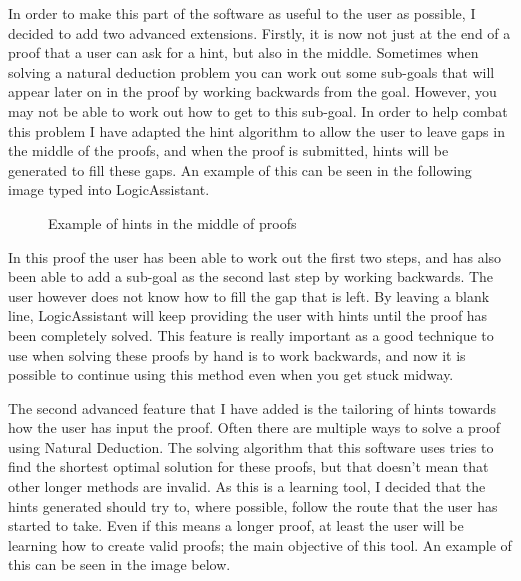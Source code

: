 In order to make this part of the software as useful to the user as possible, I decided to add two advanced extensions. Firstly, it is now not just at the end of a proof that a user can ask for a hint, but also in the middle. Sometimes when solving a natural deduction problem you can work out some sub-goals that will appear later on in the proof by working backwards from the goal. However, you may not be able to work out how to get to this sub-goal. In order to help combat this problem I have adapted the hint algorithm to allow the user to leave gaps in the middle of the proofs, and when the proof is submitted, hints will be generated to fill these gaps. An example of this can be seen in the following image typed into LogicAssistant.

\begin{figure}[!ht]
	\centering
	\caption{Example of hints in the middle of proofs}
\end{figure}

In this proof the user has been able to work out the first two steps, and has also been able to add a sub-goal as the second last step by working backwards. The user however does not know how to fill the gap that is left. By leaving a blank line, LogicAssistant will keep providing the user with hints until the proof has been completely solved. This feature is really important as a good technique to use when solving these proofs by hand is to work backwards, and now it is possible to continue using this method even when you get stuck midway. 

The second advanced feature that I have added is the tailoring of hints towards how the user has input the proof. Often there are multiple ways to solve a proof using Natural Deduction. The solving algorithm that this software uses tries to find the shortest optimal solution for these proofs, but that doesn't mean that other longer methods are invalid. As this is a learning tool, I decided that the hints generated should try to, where possible, follow the route that the user has started to take. Even if this means a longer proof, at least the user will be learning how to create valid proofs; the main objective of this tool. An example of this can be seen in the image below.

